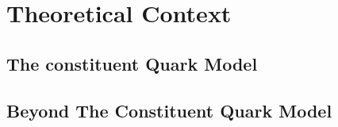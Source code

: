 \section{Theoretical Context}
\label{p1}


\subsection{The constituent Quark Model}


\subsection{Beyond The Constituent Quark Model}
